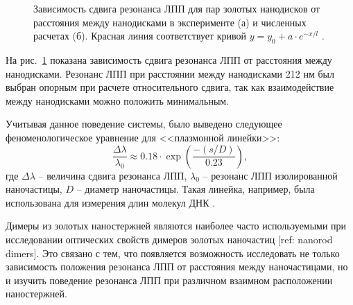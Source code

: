 \begin{figure}[t]
\caption{Зависимость сдвига резонанса ЛПП для пар золотых нанодисков от расстояния между нанодисками в эксперименте (а) и численных расчетах (б). Красная линия соответствует кривой $ y = y_0 + a \cdot e^{-x/l} $  \cite{plasonrulereq}.}
\label{img:PR_ruler}
\end{figure}

На рис.~\ref{img:PR_ruler} показана зависимость сдвига резонанса ЛПП от расстояния между нанодисками. Резонанс ЛПП при расстоянии между нанодисками 212 нм был выбран опорным при расчете относительного сдвига, так как взаимодействие между нанодисками можно положить минимальным.

Учитывая данное поведение системы, было выведено следующее феноменологическое уравнение для <<плазмонной линейки>>:
\begin{equation}
\frac{\Delta \lambda}{\lambda_0} \approx 0.18 \cdot \exp \left( \frac{-(s/D)}{0.23} \right),
\label{eq:plasmon_ruler}
\end{equation}
где $ \Delta \lambda $ -- величина сдвига резонанса ЛПП, $ \lambda_0 $ -- резонанс ЛПП изолированной наночастицы, $ D $ -- диаметр наночастицы. Такая линейка, например, была использована для измерения длин молекул ДНК \cite{bioplasmonruler3}.

Димеры из золотых наностержней являются наиболее часто используемыми при исследовании оптических свойств димеров золотых наночастиц [ref: nanorod dimers]. Это связано с тем, что появляется возможность исследовать не только зависимость положения резонанса ЛПП от расстояния между наночастицами, но и изучить поведение резонанса ЛПП при различном взаимном расположении наностержней.

